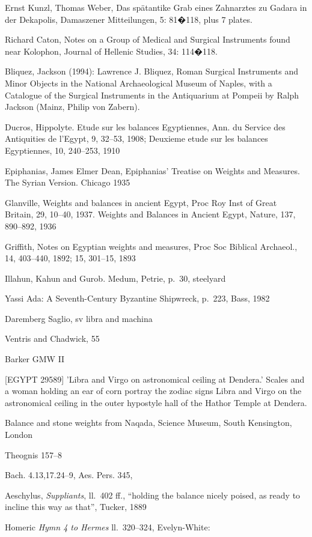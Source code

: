 \documentclass{article}
\begin{document}
Ernst Kunzl, Thomas Weber, Das sp\"atantike Grab eines Zahnarztes zu Gadara in der Dekapolis, Damaszener Mitteilungen, 5: 81�118, plus 7 plates.

Richard Caton, Notes on a Group of Medical and Surgical Instruments found near Kolophon, Journal of Hellenic Studies, 34: 114�118.

Bliquez, Jackson (1994): Lawrence J. Bliquez, Roman Surgical Instruments and Minor Objects in the National Archaeological Museum of Naples, with a Catalogue of the Surgical Instruments in the Antiquarium at Pompeii by Ralph Jackson (Mainz, Philip von Zabern).

Ducros, Hippolyte. Etude sur les balances Egyptiennes, Ann. du Service des Antiquities de l'Egypt, 9, 32--53, 1908;
Deuxieme etude sur les balances Egyptiennes, 10, 240--253, 1910

Epiphanias, James Elmer Dean, Epiphanias' Treatise on Weights and Measures. The Syrian Version. Chicago 1935

Glanville, Weights and balances in ancient Egypt, Proc Roy Inst of Great Britain, 29, 10--40, 1937. Weights and Balances in Ancient Egypt, Nature, 137, 890--892, 1936

Griffith, Notes on Egyptian weights and measures, Proc Soc Biblical Archaeol., 14, 403--440, 1892; 15, 301--15, 1893

Illahun, Kahun and Gurob. Medum, Petrie, p.~30, steelyard

Yassi Ada: A Seventh-Century Byzantine Shipwreck, p.~223, Bass, 1982

Daremberg Saglio, sv libra and machina

Ventris and Chadwick, 55

Barker GMW II

[EGYPT 29589] 'Libra and Virgo on astronomical ceiling at Dendera.' Scales and a woman holding an ear of corn portray the zodiac signs Libra and Virgo on the astronomical ceiling in the outer hypostyle hall of the Hathor Temple at Dendera. 

Balance and stone weights from Naqada, Science Museum, South Kensington, London


Theognis 157--8

Bach. 4.13,17.24--9, Aes. Pers. 345, 

Aeschylus, {\em Suppliants}, ll.~402 ff., ``holding the balance nicely poised, as ready to incline this
way as that'', Tucker, 1889

Homeric {\em Hymn 4 to Hermes} ll.~320--324, Evelyn-White:
\end{document}
